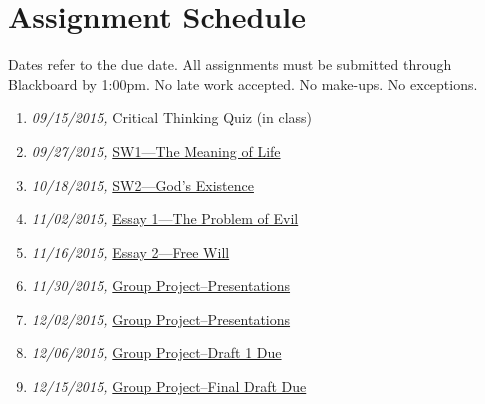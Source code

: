 \documentclass[article,oneside]{memoir}
\begin{document}
\section{Assignment Schedule}
Dates refer to the due date. All assignments must be submitted through Blackboard by 1:00pm. No late work accepted. No make-ups. No exceptions. 

\begin{enumerate}
\item \textit{09/15/2015,} Critical Thinking Quiz (in class)
\item \textit{09/27/2015,} \href{http://scoconno.github.io/Teaching/Examined/Meaning/SW1/}{SW1---The Meaning of Life}
\item \textit{10/18/2015,} \href{http://scoconno.github.io/Teaching/Examined/God/SW2/}{SW2---God's Existence}
\item \textit{11/02/2015,} \href{http://scoconno.github.io/Teaching/Examined/God/Essay1}{Essay 1---The Problem of Evil}
\item \textit{11/16/2015,} \href{http://scoconno.github.io/Teaching/Examined/FreeWill/Essay/}{Essay 2---Free Will}
\item \textit{11/30/2015,} \href{http://scoconno.github.io/Teaching/Examined/Applied/Group/}{Group Project--Presentations}
\item \textit{12/02/2015,} \href{http://scoconno.github.io/Teaching/Examined/Applied/Group/}{Group Project--Presentations}
 \item \textit{12/06/2015,} \href{http://scoconno.github.io/Teaching/Examined/Applied/Group/}{Group Project--Draft 1 Due}

\item \textit{12/15/2015,} \href{http://scoconno.github.io/Teaching/Examined/Applied/Group/}{Group Project--Final Draft Due}

\end{enumerate}




\end{document}
